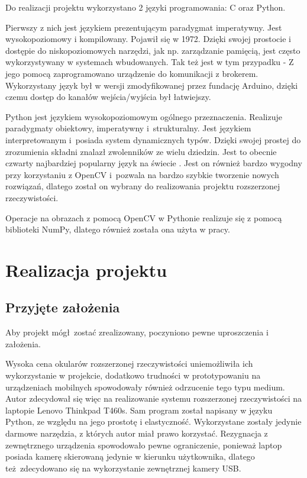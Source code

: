 \documentclass[12pt,twoside,polish]{article}
\begin{document}
Do realizacji projektu wykorzystano 2 języki programowania: C oraz Python.

Pierwszy z nich jest językiem prezentującym paradygmat imperatywny. Jest wysokopoziomowy i kompilowany. Pojawił się w 1972. Dzięki swojej prostocie i dostępie do niskopoziomowych narzędzi, jak np. zarządzanie pamięcią, jest często wykorzystywany w systemach wbudowanych. Tak też jest w tym przypadku - Z jego pomocą zaprogramowano urządzenie do komunikacji z brokerem. Wykorzystany język był w wersji zmodyfikowanej przez fundację Arduino, dzięki czemu dostęp do kanałów wejścia/wyjścia był łatwiejszy.


Python jest językiem wysokopoziomowym ogólnego przeznaczenia. Realizuje paradygmaty obiektowy, imperatywny i~strukturalny. Jest językiem interpretowanym i~posiada system dynamicznych typów. Dzięki swojej prostej do zrozumienia składni znalazł zwolenników ze wielu dziedzin. Jest to obecnie czwarty najbardziej popularny język na świecie \cite{stackoverflow}. Jest on również bardzo wygodny przy korzystaniu z OpenCV i~pozwala na bardzo szybkie tworzenie nowych rozwiązań, dlatego został on wybrany do realizowania projektu rozszerzonej rzeczywistości.

Operacje na obrazach z pomocą OpenCV w Pythonie realizuje się z pomocą biblioteki NumPy, dlatego również została ona użyta w pracy.

\clearpage	

\section{Realizacja projektu}
\subsection{Przyjęte założenia}
Aby projekt mógł zostać zrealizowany, poczyniono pewne uproszczenia i założenia.

Wysoka cena okularów rozszerzonej rzeczywistości uniemożliwiła ich wykorzystanie w projekcie, dodatkowo trudności w prototypowaniu na urządzeniach mobilnych spowodowały również odrzucenie tego typu medium. Autor zdecydował się więc na realizowanie systemu rozszerzonej rzeczywistości na laptopie Lenovo Thinkpad T460s. Sam program został napisany w języku Python, ze względu na jego prostotę i elastyczność. Wykorzystane zostały jedynie darmowe narzędzia, z których autor miał prawo korzystać. Rezygnacja z zewnętrznego urządzenia spowodowało pewne ograniczenie, ponieważ laptop posiada kamerę skierowaną jedynie w kierunku użytkownika, dlatego też zdecydowano się na wykorzystanie zewnętrznej kamery USB.
\end{document}
